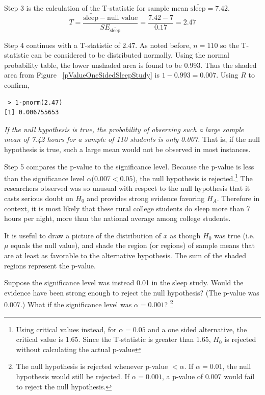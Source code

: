 Step 3 is the calculation of the T-statistic for sample mean $\bar{\mathrm{sleep}} = 7.42$. 
\[ T = \frac{\bar{\mathrm{sleep}} - \text{null value}}{SE_{\bar{\mathrm{sleep}}}} = \frac{7.42 - 7}{0.17} = 2.47\]

Step 4 continues with a T-statistic of 2.47. As noted before, $n=110$ so the T-statistic can be considered to be distributed normally. Using the normal probability table, the lower unshaded area is found to be 0.993. Thus the shaded area from Figure ~\ref{pValueOneSidedSleepStudy} is $1-0.993 = 0.007$. Using $R$ to confirm,
 \begin{verbatim} 
 > 1-pnorm(2.47)
[1] 0.006755653 
\end{verbatim}
{\em If the null hypothesis is true, the probability of observing such a large sample mean of 7.42 hours for a sample of 110 students is only 0.007.} That is, if the null hypothesis is true, such a large mean would not be observed in most instances. 

Step 5 compares the p-value to the significance level. Because the p-value is less than the significance level $\alpha$($0.007 < 0.05$), the null hypothesis is rejected.\footnote{Using critical values instead, for $\alpha=0.05$ and a one sided alternative, the critical value is 1.65. Since the T-statistic is greater than 1.65, $H_0$ is rejected without calculating the actual p-value} The researchers observed was so unusual with respect to the null hypothesis that it casts serious doubt on $H_0$ and provides strong evidence favoring $H_A$. Therefore in context, it is most likely that these rural college students do sleep more than 7 hours per night, more than the national average among college students. 

\begin{tipBox}{
It is useful to draw a picture of the distribution of $\bar{x}$ as though $H_0$ was true (i.e. $\mu$ equals the null value), and shade the region (or regions) of sample means that are at least as favorable to the alternative hypothesis. The sum of the shaded regions represent the p-value.}
\end{tipBox}

\begin{exercise}
Suppose the significance level was instead 0.01 in the sleep study. Would the evidence have been strong enough to reject the null hypothesis? (The p-value was 0.007.) What if the significance level was $\alpha = 0.001$? \footnote{The null hypothesis is rejected whenever p-value $< \alpha$. If $\alpha = 0.01$, the null hypothesis would still be rejected. If $\alpha = 0.001$, a p-value of 0.007 would fail to reject the null hypothesis.}
\end{exercise}

